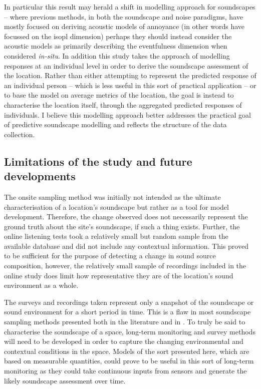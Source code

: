    In particular this result may herald a shift in modelling approach for soundscapes -- where previous methods, in both the soundscape and noise paradigms, have mostly focused on deriving acoustic models of annoyance (in other words have focussed on the \gls{isopl} dimension) perhaps they should instead consider the acoustic models as primarily describing the eventfulness dimension when considered \emph{in-situ}. In addition this study takes the approach of modelling responses at an individual level in order to derive the soundscape assessment of the location. Rather than either attempting to represent the predicted response of an individual person -- which is less useful in this sort of practical application -- or to base the model on average metrics of the location, the goal is instead to characterise the location itself, through the aggregated predicted responses of individuals. I believe this modelling approach better addresses the practical goal of predictive soundscape modelling and reflects the structure of the data collection.

 \subsection{Limitations of the study and future developments}

   The onsite sampling method was initially not intended as the ultimate characterisation of a location's soundscape but rather as a tool for model development. Therefore, the change observed does not necessarily represent the ground truth about the site's soundscape, if such a thing exists. Further, the online listening tests took a relatively small but random sample from the available database and did not include any contextual information. This proved to be sufficient for the purpose of detecting a change in sound source composition, however, the relatively small sample of recordings included in the online study does limit how representative they are of the location's sound environment as a whole.

   The surveys and recordings taken represent only a snapshot of the soundscape or sound environment for a short period in time. This is a flaw in most soundscape sampling methods presented both in the literature and in \citet{ISO12913Part2}. To truly be said to characterise the soundscape of a space, long-term monitoring and survey methods will need to be developed in order to capture the changing environmental and contextual conditions in the space. Models of the sort presented here, which are based on measurable quantities, could prove to be useful in this sort of long-term monitoring as they could take continuous inputs from sensors and generate the likely soundscape assessment over time.

